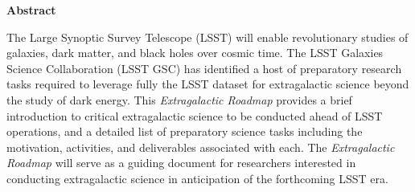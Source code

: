 \begin{center}

\vspace*{30mm}

{\bf Abstract} 
\vspace*{5mm}

The Large Synoptic Survey Telescope (LSST) will enable revolutionary studies of
galaxies, dark matter, and black holes over cosmic time. The
LSST Galaxies Science Collaboration (LSST GSC) has identified a host of preparatory research tasks required 
to leverage fully the LSST dataset for extragalactic science beyond the study of dark energy.
This {\it Extragalactic Roadmap} provides a brief introduction to critical extragalactic science to be conducted ahead of LSST operations, and a detailed list of preparatory science tasks including the motivation, activities, and deliverables associated with each. The {\it Extragalactic Roadmap} will serve as a guiding document for researchers interested in conducting extragalactic science in anticipation of the forthcoming LSST era.
\end{center}
